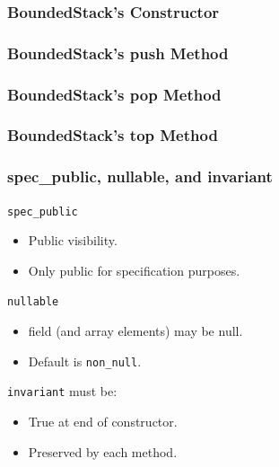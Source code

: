 \begin{frame}[fragile]
\frametitle{BoundedStack's Constructor}

\end{frame}

\begin{frame}[fragile]
\frametitle{BoundedStack's push Method}

\end{frame}

\begin{frame}[fragile]
\frametitle{BoundedStack's pop Method}

\end{frame}

\begin{frame}[fragile]
\frametitle{BoundedStack's top Method}

\end{frame}

\begin{frame}[fragile]
\frametitle{spec\_public, nullable, and invariant}

\lstinline!spec_public!
\begin{itemize}
\item
Public visibility.

\item
Only public for specification purposes.
\end{itemize}


\lstinline!nullable!
\begin{itemize}
\item
field (and array elements) may be null.

\item
Default is \lstinline!non_null!.
\end{itemize}

\lstinline!invariant! must be:
\begin{itemize}
\item
True at end of constructor.

\item
Preserved by each method.
\end{itemize}

\end{frame}

